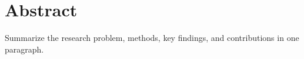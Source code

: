 \chapter*{Abstract}

Summarize the research problem, methods, key findings, and contributions in one paragraph.

